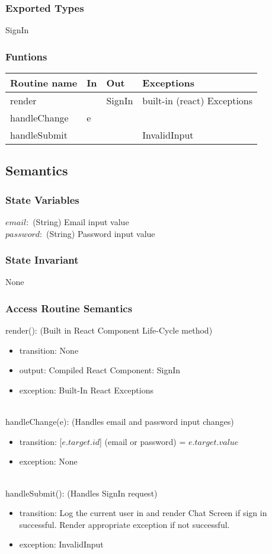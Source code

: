 \documentclass[12pt, titlepage]{article}
\begin{document}
\subsubsection* {Exported Types} SignIn
\subsubsection* {Funtions}
\begin{tabular}{| l | l | l | l |}
\hline
\textbf{Routine name} & \textbf{In} & \textbf{Out} & \textbf{Exceptions}\\
\hline
render & ~ & SignIn & built-in (react) Exceptions\\
\hline
handleChange & e & ~ & ~\\
\hline
handleSubmit & ~ & ~ & InvalidInput\\
\hline
\end{tabular}
\subsection* {Semantics}

\subsubsection* {State Variables}
$email: $ (String) Email input value\\
$password:$ (String) Password input value\\
\subsubsection* {State Invariant}
None
\newpage
\subsubsection* {Access Routine Semantics}

render(): (Built in React Component Life-Cycle method)
\begin{itemize}
\item transition: None
\item output: Compiled React Component: SignIn 
\item exception: Built-In React Exceptions
\end{itemize}\\
handleChange(e): (Handles email and password input changes)
\begin{itemize}
\item transition: [$e.target.id$] (email or password) = $e.target.value$
\item exception: None
\end{itemize}\\
handleSubmit(): (Handles SignIn request)
\begin{itemize}
\item transition: Log the current user in and render Chat Screen if sign in successful. Render appropriate exception if not successful.
\item exception: InvalidInput 
\end{itemize}
\end{document}
